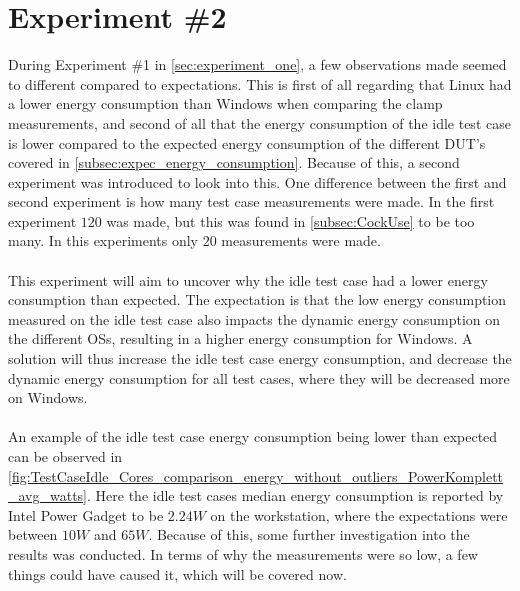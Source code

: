 \section{Experiment \#2}\label{sec:experiment_two}

During Experiment \#1 in \cref{sec:experiment_one}, a few observations made seemed to different compared to expectations. This is first of all regarding that Linux had a lower energy consumption than Windows when comparing the clamp measurements, and second of all that the energy consumption of the idle test case is lower compared to the expected energy consumption of the different DUT's covered in \cref{subsec:expec_energy_consumption}. Because of this, a second experiment was introduced to look into this. One difference between the first and second experiment is how many test case measurements were made. In the first experiment $120$ was made, but this was found in \cref{subsec:CockUse} to be too many. In this experiments only $20$ measurements were made. 

\paragraph*{}
This experiment will aim to uncover why the idle test case had a lower energy consumption than expected. The expectation is that the low energy consumption measured on the idle test case also impacts the dynamic energy consumption on the different OSs, resulting in a higher energy consumption for Windows. A solution will thus increase the idle test case energy consumption, and decrease the dynamic energy consumption for all test cases, where they will be decreased more on Windows. 

\paragraph*{}
An example of the idle test case energy consumption being lower than expected can be observed in \cref{fig:TestCaseIdle_Cores_comparison_energy_without_outliers_PowerKomplett_avg_watts}. Here the idle test cases median energy consumption is reported by Intel Power Gadget to be $2.24W$ on the workstation, where the expectations were between $10W$ and $65W$. Because of this, some further investigation into the results was conducted. In terms of why the measurements were so low, a few things could have caused it, which will be covered now.



